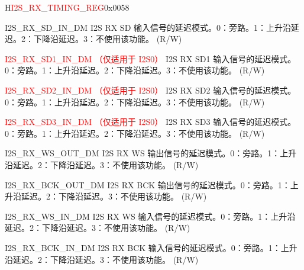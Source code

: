 \begin{register}{H}{\textcolor{red}{I2S\_RX\_TIMING\_REG}}{0x{}0058}\label{regdesc:I2SRXTIMINGREG}
%
%
%
%
%
%
%
%
%
%
%
%
%
%
%
%
\regnewline%
\begin{regdesc}\begin{reglist}
\label{fielddesc:I2SRXSDINDM}\item [I2S\_RX\_SD\_IN\_DM] I2S RX SD 输入信号的延迟模式。0：旁路。1：上升沿延迟。2：下降沿延迟。3：不使用该功能。 (R/W)
\label{fielddesc:I2SRXSD1INDM}\item [\textcolor{red}{I2S\_RX\_SD1\_IN\_DM （仅适用于 I2S0）}] I2S RX SD1 输入信号的延迟模式。0：旁路。1：上升沿延迟。2：下降沿延迟。3：不使用该功能。 (R/W)
\label{fielddesc:I2SRXSD2INDM}\item [\textcolor{red}{I2S\_RX\_SD2\_IN\_DM （仅适用于 I2S0）}] I2S RX SD2 输入信号的延迟模式。0：旁路。1：上升沿延迟。2：下降沿延迟。3：不使用该功能。 (R/W)
\label{fielddesc:I2SRXSD3INDM}\item [\textcolor{red}{I2S\_RX\_SD3\_IN\_DM （仅适用于 I2S0）}] I2S RX SD3 输入信号的延迟模式。0：旁路。1：上升沿延迟。2：下降沿延迟。3：不使用该功能。 (R/W)
\label{fielddesc:I2SRXWSOUTDM}\item [I2S\_RX\_WS\_OUT\_DM] I2S RX WS 输出信号的延迟模式。0：旁路。1：上升沿延迟。2：下降沿延迟。3：不使用该功能。 (R/W)
\label{fielddesc:I2SRXBCKOUTDM}\item [I2S\_RX\_BCK\_OUT\_DM] I2S RX BCK 输出信号的延迟模式。0：旁路。1：上升沿延迟。2：下降沿延迟。3：不使用该功能。 (R/W)
\label{fielddesc:I2SRXWSINDM}\item [I2S\_RX\_WS\_IN\_DM] I2S RX WS 输入信号的延迟模式。0：旁路。1：上升沿延迟。2：下降沿延迟。3：不使用该功能。 (R/W)
\label{fielddesc:I2SRXBCKINDM}\item [I2S\_RX\_BCK\_IN\_DM] I2S RX BCK 输入信号的延迟模式。0：旁路。1：上升沿延迟。2：下降沿延迟。3：不使用该功能。 (R/W)
\end{reglist}\end{regdesc}
\end{register}


